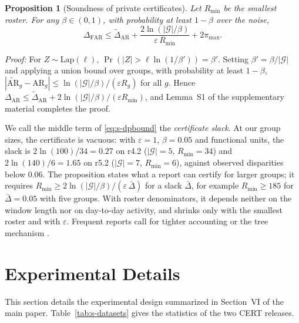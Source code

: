 \documentclass[10pt,onecolumn,letterpaper]{article}
\newenvironment{IEEEproof}[1][Proof]{\par\textit{#1:}}{\par}
\newtheorem{proposition}{Proposition}
\newcommand{\G}{\mathcal{G}}
\newcommand{\AR}{\mathrm{AR}}
\newcommand{\FAR}{\mathrm{FAR}}
\newcommand{\Lap}{\mathrm{Lap}}
\newcommand{\Prob}{\Pr}
\begin{document}
\begin{proposition}[Soundness of private certificates]
\label{prop:s-dp}
Let $R_{\min}$ be the smallest roster. For any $\beta\in(0,1)$, with probability at least $1-\beta$ over the noise,
\begin{equation}
\Delta_{\FAR}\le\widetilde{\Delta}_{\AR}+\frac{2\ln(|\G|/\beta)}{\varepsilon\,R_{\min}}+2\pi_{\max}.
\label{eq:s-dpbound}
\end{equation}
\end{proposition}
\begin{IEEEproof}
For $Z\sim\Lap(\ell)$, $\Prob(|Z|>\ell\ln(1/\beta'))=\beta'$. Setting $\beta'=\beta/|\G|$ and applying a union bound over groups, with probability at least $1-\beta$, $|\widetilde{\AR}_g-\AR_g|\le\ln(|\G|/\beta)/(\varepsilon R_g)$ for all $g$. Hence $\Delta_{\AR}\le\widetilde{\Delta}_{\AR}+2\ln(|\G|/\beta)/(\varepsilon R_{\min})$, and Lemma~S1 of the supplementary material completes the proof.
\end{IEEEproof}

We call the middle term of \eqref{eq:s-dpbound} the \emph{certificate slack}. At our group sizes, the certificate is vacuous: with $\varepsilon=1$, $\beta=0.05$ and functional units, the slack is $2\ln(100)/34=0.27$ on r4.2 ($|\G|=5$, $R_{\min}=34$) and $2\ln(140)/6=1.65$ on r5.2 ($|\G|=7$, $R_{\min}=6$), against observed disparities below $0.06$. The proposition states what a report can certify for larger groups; it requires $R_{\min}\ge2\ln(|\G|/\beta)/(\varepsilon\,\bar\Delta)$ for a slack $\bar\Delta$, for example $R_{\min}\ge185$ for $\bar\Delta=0.05$ with five groups. With roster denominators, it depends neither on the window length nor on day-to-day activity, and shrinks only with the smallest roster and with $\varepsilon$. Frequent reports call for tighter accounting \cite{bun2016concentrated} or the tree mechanism \cite{dwork2010continual,chan2011private}.

\section{Experimental Details}
\label{sec:s-features}
This section details the experimental design summarized in Section~VI of the main paper. Table~\ref{tab:s-datasets} gives the statistics of the two CERT releases.

\begin{table}[!t]
\caption{Dataset Statistics (Active User-Days, Temporal Split)\label{tab:s-datasets}}
\centering
{}
\end{table}
\end{document}
